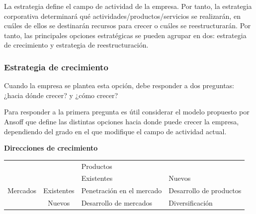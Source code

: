 \documentclass[10pt,a4paper,spanish]{report}
\begin{document}
                  La estrategia define el campo de actividad de la empresa. Por tanto, la estrategia corporativa determinará qué actividades/productos/servicios se realizarán, en cuáles de ellos se destinarán recursos para crecer o cuáles se reestructurarán. Por tanto, las principales opciones estratégicas se pueden agrupar en dos: estrategia de crecimiento y estrategia de reestructuración.

                  \subsubsection{\textcolor[rgb]{0.4,0.9,0.6}Estrategia de crecimiento}

                        Cuando la empresa se plantea esta opción, debe responder a dos preguntas: ¿hacia dónde crecer? y ¿cómo crecer?

                        Para responder a la primera pregunta es útil considerar el modelo propuesto por Ansoff que define las distintas opciones hacia donde puede crecer la empresa, dependiendo del grado en el que modifique el campo de actividad actual. \\

                        \begin{center}
                        \textbf{Direcciones de crecimiento}
                        \begin{tabular}{c c|p{3cm}|p{3cm}|}
                              \cline{3-4}
                              & &\multicolumn{2}{|l|}{\cellcolor[rgb]{0.4,0.9,0.6}Productos} \\
                              \cline{3-4}
                              & &\cellcolor[rgb]{0.4,0.9,0.6}Existentes &\cellcolor[rgb]{0.4,0.9,0.6} Nuevos \\
                              \hline
                              \cellcolor[rgb]{0.4,0.9,0.6}Mercados & \cellcolor[rgb]{0.4,0.9,0.6}Existentes & Penetración en el mercado & Desarrollo de productos \\
                              \cline{2-4}
                              \cellcolor[rgb]{0.4,0.9,0.6}& \cellcolor[rgb]{0.4,0.9,0.6}Nuevos & Desarrollo de mercados & \cellcolor[rgb]{0.4,0.9,0.6}Diversificación \\
                              \hline
                        \end{tabular}
                        \end{center}
\end{document}
